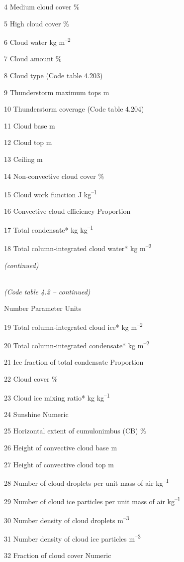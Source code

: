 4 Medium cloud cover \%

5 High cloud cover \%

6 Cloud water kg m\textsuperscript{--2}

7 Cloud amount \%

8 Cloud type (Code table 4.203)

9 Thunderstorm maximum tops m

10 Thunderstorm coverage (Code table 4.204)

11 Cloud base m

12 Cloud top m

13 Ceiling m

14 Non-convective cloud cover \%

15 Cloud work function J kg\textsuperscript{--1}

16 Convective cloud efficiency Proportion

17 Total condensate* kg kg\textsuperscript{--1}

18 Total column-integrated cloud water* kg m\textsuperscript{--2}

\emph{(continued)}

\emph{\\
(Code table 4.2 -- continued)}

Number Parameter Units

19 Total column-integrated cloud ice* kg m\textsuperscript{--2}

20 Total column-integrated condensate* kg m\textsuperscript{--2}

21 Ice fraction of total condensate Proportion

22 Cloud cover \%

23 Cloud ice mixing ratio* kg kg\textsuperscript{--1}

24 Sunshine Numeric

25 Horizontal extent of cumulonimbus (CB) \%

26 Height of convective cloud base m

27 Height of convective cloud top m

28 Number of cloud droplets per unit mass of air kg\textsuperscript{--1}

29 Number of cloud ice particles per unit mass of air kg\textsuperscript{--1}

30 Number density of cloud droplets m\textsuperscript{--3}

31 Number density of cloud ice particles m\textsuperscript{--3}

32 Fraction of cloud cover Numeric

